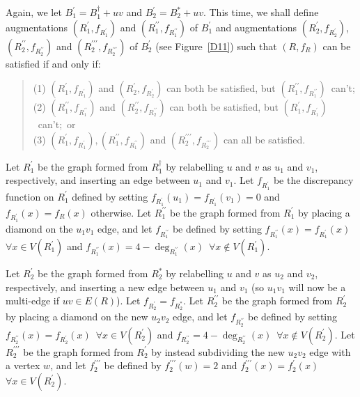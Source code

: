 \documentclass{article}
\newtheorem{Proof of Theorem}{Proof of Theorem}
\begin{document}
Again, we let $B_{1}^{\prime} = B_{1}^{\dag} + uv$ and $B_{2}^{\prime} = B_{2}^{*} + uv$.
This time,
we shall define augmentations 
$\left( R_{1}^{\prime},f_{R_{1}^{\prime}} \right)$ 
and $\left( R_{1}^{\prime\prime},f_{R_{1}^{\prime\prime}} \right)$ of $B_{1}^{\prime}$
and augmentations 
$\left( R_{2}^{\prime},f_{R_{2}^{\prime}} \right)$, $\left( R_{2}^{\prime\prime},f_{R_{2}^{\prime\prime}} \right)$
and $\left( R_{2}^{\prime\prime\prime},f_{R_{2}^{\prime\prime\prime}} \right)$ of $B_{2}^{\prime}$
(see Figure~\ref{D11})
such that
$(R,f_{R})$ can be satisfied if and only if: 
\begin{quote}
(1) $\left( R_{1}^{\prime},f_{R_{1}^{\prime}} \right)$ and $\left( R_{2}^{\prime},f_{R_{2}^{\prime}} \right)$ 
can both be satisfied, 
but $\left( R_{1}^{\prime\prime},f_{R_{1}^{\prime\prime}} \right)$~can't; \\ 
(2) $\left( R_{1}^{\prime\prime},f_{R_{1}^{\prime\prime}} \right)$ 
and $\left( R_{2}^{\prime\prime},f_{R_{2}^{\prime\prime}} \right)$ 
can both be satisfied, 
but $\left( R_{1}^{\prime},f_{R_{1}^{\prime}} \right)$~can't;~or \\
(3) $\left( R_{1}^{\prime},f_{R_{1}^{\prime}} \right),\left( R_{1}^{\prime\prime},f_{R_{1}^{\prime\prime}} \right)$ 
and $\left( R_{2}^{\prime\prime\prime},f_{R_{2}^{\prime\prime\prime}} \right)$ can all be satisfied. 
\end{quote}

Let $R_{1}^{\prime}$ be the graph formed from $R_{1}^{\dag}$ by relabelling $u$ and $v$ as $u_{1}$ and $v_{1}$,
respectively,
and inserting an edge between $u_{1}$ and $v_{1}$.
Let $f_{R_{1}^{\prime}}$ be the discrepancy function on $R_{1}^{\prime}$ defined by setting
$f_{R_{1}^{\prime}}(u_{1})=f_{R_{1}^{\prime}}(v_{1})=0$
and $f_{R_{1}^{\prime}}(x) = f_{R}(x)$ otherwise.
Let $R_{1}^{\prime\prime}$ be the graph formed from $R_{1}^{\prime}$ by placing a diamond on the $u_{1}v_{1}$ edge,
and let $f_{R_{1}^{\prime\prime}}$ be defined by setting
$f_{R_{1}^{\prime\prime}}(x)=f_{R_{1}^{\prime}}(x)$~$\forall x \in V(R_{1}^{\prime})$
and $f_{R_{1}^{\prime\prime}}(x) = 4 - \deg_{R_{1}^{\prime\prime}}(x)$~$\forall x \notin V(R_{1}^{\prime})$.

Let $R_{2}^{\prime}$ be the graph formed from $R_{2}^{*}$ by relabelling $u$ and $v$ as $u_{2}$ and $v_{2}$,
respectively,
and inserting a new edge between $u_{1}$ and $v_{1}$
(so $u_{1}v_{1}$ will now be a multi-edge if $uv \in E(R)$).
Let $f_{R_{2}^{\prime}} = f_{R_{2}^{*}}$.
Let $R_{2}^{\prime\prime}$ be the graph formed from $R_{2}^{\prime}$ by
placing a diamond on the new $u_{2}v_{2}$ edge,
and let $f_{R_{2}^{\prime\prime}}$ be defined by setting
$f_{R_{2}^{\prime\prime}}(x)=f_{R_{2}^{\prime}}(x)$~$\forall x \in V(R_{2}^{\prime})$
and $f_{R_{2}^{\prime\prime}} = 4 - \deg_{R_{2}^{\prime\prime}}(x)$~$\forall x \notin V(R_{2}^{\prime})$.
Let $R_{2}^{\prime\prime\prime}$ be the graph formed from $R_{2}^{\prime}$
by instead subdividing the new $u_{2}v_{2}$ edge with a vertex $w$,
and let $f_{2}^{\prime\prime\prime}$ be defined by
$f_{2}^{\prime\prime\prime}(w)=2$
and $f_{2}^{\prime\prime\prime}(x) = f_{2}^{\prime}(x)$~$\forall x \in V(R_{2}^{\prime})$.
\end{document}
